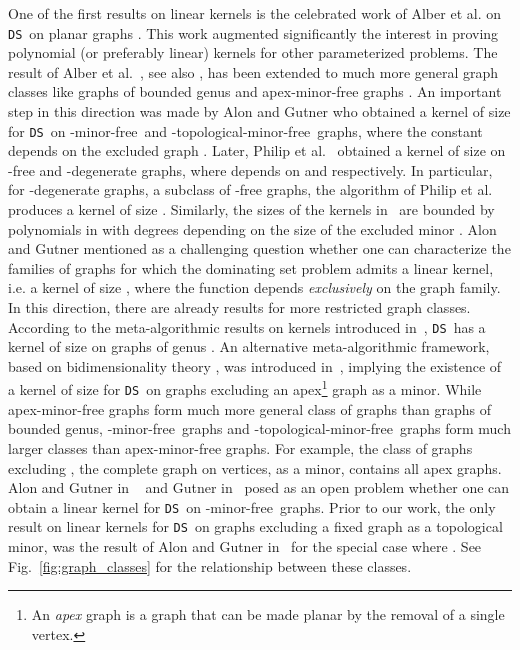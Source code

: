 \documentclass[11pt]{article}
\newcommand{\tHmf}{-topological-minor-free}
\newcommand{\Hmf}{-minor-free}
\newcommand{\tDS}{{\texttt{\sc DS}}}
\begin{document}
    
  One of  the  first  results  on linear kernels is the celebrated work of Alber et al.  on  \tDS \,  on planar graphs \cite{AlberFN04}. This work  augmented significantly the interest in  proving polynomial (or preferably linear) 
 kernels for other parameterized problems.   
  The result of Alber et al.~\cite{AlberFN04}, see also  \cite{ChenFKX07}, has been extended to much more general graph classes like graphs of bounded genus \cite{H.Bodlaender:2009ng} and apex-minor-free graphs \cite{F.V.Fomin:2010oq}.
An important step in this direction was made by  Alon and Gutner \cite{AG08TechReport,Gutner09}  who obtained a kernel of size  for  \tDS \,  on \Hmf\,  and \tHmf\,  graphs, where the constant  depends on the excluded graph . Later, Philip et al.~\cite{PhilipRS09} obtained a kernel of size  on  -free and -degenerate graphs, where  depends on  and  respectively.  In particular, for -degenerate graphs, a subclass of -free graphs,  the algorithm of   Philip et al.~\cite{PhilipRS09} produces a kernel of size
 . Similarly, the sizes of   the kernels in~\cite{AG08TechReport,Gutner09,PhilipRS09} are bounded by  polynomials in  with degrees depending on the size of the excluded minor . 
  Alon and Gutner \cite{AG08TechReport} mentioned as a  challenging question  whether one can  characterize the families of graphs for which the dominating set problem admits a linear kernel, i.e. a kernel  of size , where the function  depends {\em exclusively} on the 
graph family. 
In this direction, there are already results for more restricted graph classes.
According to
the meta-algorithmic results on kernels introduced in~\cite{H.Bodlaender:2009ng},  \tDS \,  has a kernel 
of size  on graphs of genus . An alternative meta-algorithmic 
framework, based on bidimensionality theory \cite{DemaineFHT05sub}, was introduced in~\cite{F.V.Fomin:2010oq}, implying the existence of a kernel of size  for \tDS \, on graphs excluding an { apex\footnote{An {\em apex} graph is a graph that can be made planar by the removal of a single vertex.}} graph  as a minor. While apex-minor-free graphs form much more general class of graphs than  graphs of bounded genus, \Hmf\,  graphs  and \tHmf\, graphs form much larger classes than apex-minor-free graphs. For example, the class of graphs excluding , the complete  graph on  vertices, as a minor, contains all apex graphs. Alon and Gutner in ~\cite{AG08TechReport} and Gutner  in~\cite{Gutner09} posed as an open problem  
whether one can obtain a linear kernel for \tDS \,  on \Hmf\,  graphs.
Prior to our work, the only result on linear kernels for \tDS \, on graphs excluding a fixed graph  as a topological minor, was the result of  
 Alon and Gutner  in~\cite{AG08TechReport}  for the  special case where .
See Fig.~\ref{fig:graph_classes} for the relationship between these classes.  
\end{document}
